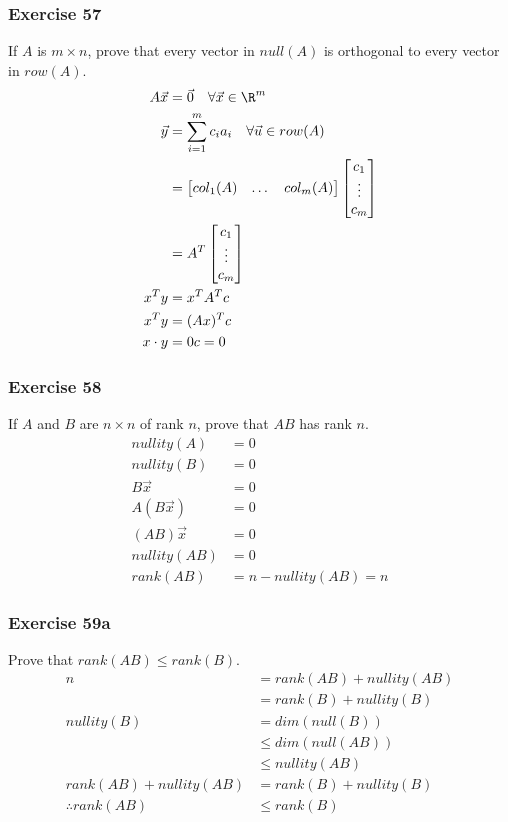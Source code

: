\documentclass[letterpaper, 12pt]{math}
\begin{document}
\subsubsection*{Exercise 57}
If \( A \) is \( m\times n \), prove that every vector in \( null(A) \) is
orthogonal to every vector in \( row(A) \).
\begin{align*}
  A\vec{x} &= \vec{0} \quad \forall{\vec{x}}\in\R^m \\
  \vec{y} &= \sum_{i=1}^{m}c_ia_i \quad \forall{\vec{u}}\in row(A) \\
  &= \begin{bmatrix}col_1(A) & \dots & col_m(A)\end{bmatrix}
    \begin{bmatrix}c_1 \\ \vdots \\ c_m\end{bmatrix} \\
  &= A^T\begin{bmatrix}c_1 \\ \vdots \\ c_m\end{bmatrix} \\
  x^Ty &= x^TA^Tc \\
  x^Ty &= (Ax)^Tc \\
  x\cdot y
   &= 0c = 0
\end{align*}

\subsubsection*{Exercise 58}
If \( A \) and \( B \) are \( n\times n \) of rank \( n \), prove that \( AB \)
has rank \( n \).
\begin{align*}
  nullity(A) &= 0 \\
  nullity(B) &= 0 \\
  B\vec{x} &= 0 \\
  A(B\vec{x}) &= 0 \\
  (AB)\vec{x} &= 0 \\
  nullity(AB) &= 0 \\
  rank(AB) &= n-nullity(AB) = n
\end{align*}

\subsubsection*{Exercise 59a}
Prove that \( rank(AB)\le rank(B) \).
\begin{align*}
  n &= rank(AB)+nullity(AB) \\
  &= rank(B)+nullity(B) \\
  nullity(B) &= dim(null(B)) \\
  &\le dim(null(AB)) \\
  &\le nullity(AB) \\
  rank(AB)+nullity(AB) &= rank(B)+nullity(B) \\
  \therefore rank(AB) &\le rank(B)
\end{align*}
\end{document}
